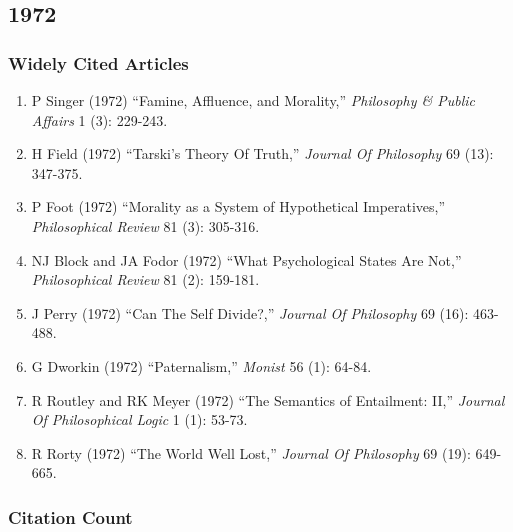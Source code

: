 \documentclass[
  10pt,
  letterpaper,
  DIV=11,
  numbers=noendperiod,
  twoside]{scrartcl}
\providecommand{\tightlist}{%
  \setlength{\itemsep}{0pt}\setlength{\parskip}{0pt}}\usepackage{longtable,booktabs,array}
\begin{document}
\newpage

\subsection{1972}\label{sec-s1972}

\subsubsection*{Widely Cited Articles}\label{widely-cited-articles-16}

\begin{enumerate}
\def\labelenumi{\arabic{enumi}.}
\tightlist
\item
  P Singer (1972) ``Famine, Affluence, and Morality,'' \emph{Philosophy
  \& Public Affairs} 1 (3): 229-243.
\item
  H Field (1972) ``Tarski's Theory Of Truth,'' \emph{Journal Of
  Philosophy} 69 (13): 347-375.
\item
  P Foot (1972) ``Morality as a System of Hypothetical Imperatives,''
  \emph{Philosophical Review} 81 (3): 305-316.
\item
  NJ Block and JA Fodor (1972) ``What Psychological States Are Not,''
  \emph{Philosophical Review} 81 (2): 159-181.
\item
  J Perry (1972) ``Can The Self Divide?,'' \emph{Journal Of Philosophy}
  69 (16): 463-488.
\item
  G Dworkin (1972) ``Paternalism,'' \emph{Monist} 56 (1): 64-84.
\item
  R Routley and RK Meyer (1972) ``The Semantics of Entailment: II,''
  \emph{Journal Of Philosophical Logic} 1 (1): 53-73.
\item
  R Rorty (1972) ``The World Well Lost,'' \emph{Journal Of Philosophy}
  69 (19): 649-665.
\end{enumerate}

\subsubsection*{Citation Count}\label{sec-count-1972}
\end{document}
